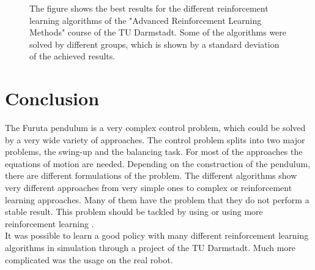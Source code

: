  \begin{figure}[h]
 	\centering
	\scalebox{.4}{}
	\caption{The figure shows the best results for the different reinforcement 
	learning algorithms of the "Advanced Reinforcement Learning Methods" 
	course 
	of the TU Darmstadt. Some of the algorithms were solved by different 
	groups, which is shown by a standard deviation of the achieved results.}
	\label{fig:rewards}
\end{figure}



\section{Conclusion}
The Furuta pendulum is a very complex control problem, which could be solved by 
a very wide variety of approaches. The control problem splits into two major 
problems, the swing-up and the balancing task. For most of the approaches the 
equations of motion are needed. Depending on the construction of the pendulum, 
there are different formulations of the problem. The different algorithms show 
very different approaches from very simple ones to complex or reinforcement 
learning approaches. Many of them have the problem that they do not perform a 
stable result. This problem should be tackled by using or using more 
reinforcement learning \citep{wang2004minimum}.\\
It was possible to learn a good policy with many different reinforcement 
learning algorithms in simulation through a project of the TU Darmstadt. Much 
more complicated was the usage on the real robot.








